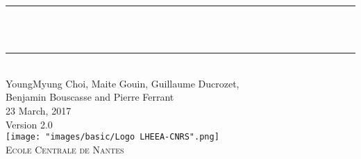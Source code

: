 
\fancyhf{}
\cfoot{\thepage}

\makeatletter
\let\thetitle\@title
\let\theauthor\@author
\let\thedate\@date
\makeatother


\begin{titlepage}
	\centering
    \vspace*{0.5 cm}    

	\rule{\linewidth}{0.2 mm} \\[0.8 cm]
	{ \huge \bfseries \thetitle}\\[0.3 cm]
	\rule{\linewidth}{0.2 mm} \\[0.8 cm]
	\textup{\large YoungMyung Choi, Maite Gouin, Guillaume Ducrozet, }\\[0.5 cm]		
	\textup{\large Benjamin Bouscasse and Pierre Ferrant}\\[1.0 cm]		
	
	\large{23 March, 2017} \\[0.5cm]	
	\large{Version 2.0} \\[4.0cm]

	\texttt{[image: "images/basic/Logo LHEEA-CNRS".png]}  \\[1.5 cm]
	
	 \textsc{\LARGE Ecole Centrale de Nantes}\\[1.0 cm]	%
	 
\end{titlepage}